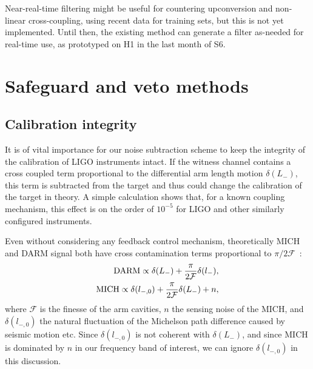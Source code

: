 Near-real-time filtering might be useful for countering upconversion and non-linear cross-coupling, using recent data for training sets, but this is not yet implemented. Until then, the existing method can generate a filter as-needed for real-time use, as prototyped on H1 in the last month of S6.

\section{Safeguard and veto methods}
\label{safeguards}


  \subsection{Calibration integrity}
  \label{CalibrationSection}

It is of vital importance for our noise subtraction scheme to keep the integrity of the calibration of LIGO instruments intact.
If the witness channel contains a cross coupled term proportional to the differential arm length motion $\delta(L_-)$, this term is subtracted from the target and thus could change the calibration of the target in theory.
A simple calculation shows that, for a known coupling mechanism, this effect is on the order of $10^{-5}$ for LIGO and other similarly configured instruments.

Even without considering any feedback control mechanism, theoretically MICH and DARM signal both have cross contamination terms proportional to $\pi/2\mathcal{F}$~\cite{SiggFreq1997}:
\begin{eqnarray}
\textup{DARM} \propto \delta(L_-) + \frac{\pi}{2 \mathcal{F}} \delta(l_-) \label{CalDARMdef}, \\
\textup{MICH} \propto \delta(l_{-,0}) + \frac{\pi}{2 \mathcal{F}} \delta(L_-) + n \label{CalMICHdef},
\end{eqnarray}
where $\mathcal{F}$ is the finesse of the arm cavities, $n$ the sensing noise of the MICH, and $\delta(l_{-,0})$ the natural fluctuation of the Michelson path difference caused by seismic motion etc.
Since  $\delta(l_{-,0})$  is not coherent with $ \delta(L_-)$, and since MICH is dominated by $n$ in our frequency band of interest, we can ignore $\delta(l_{-,0})$ in this discussion.

